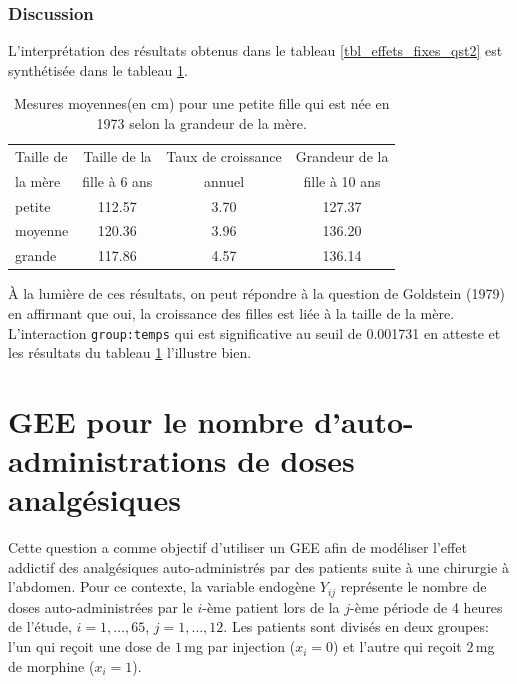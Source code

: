 \documentclass{article}
\begin{document}
	\subsubsection*{Discussion}
		L'interprétation des résultats obtenus dans le tableau \ref{tbl_effets_fixes_qst2} est synthétisée dans le tableau \ref{tbl_interpretation_qst2}.
		\begin{table}[H]
			\centering
			\begin{tabular}{lccc}
				\hline
				Taille de  & Taille de la  & Taux de croissance  &  Grandeur de la \\
				la mère & fille à 6 ans & annuel &  fille à 10 ans \\
				\hline
				petite & 112.57 & 3.70 & 127.37 \\
				moyenne & 120.36 & 3.96 & 136.20 \\
				grande & 117.86 & 4.57 & 136.14 \\
				\hline
			\end{tabular}
			\caption{Mesures moyennes(en cm) pour une petite fille qui est née en 1973 selon la grandeur de la mère.}
			\label{tbl_interpretation_qst2}
		\end{table}
				
		À la lumière de ces résultats, on peut répondre à la question de Goldstein (1979) en affirmant que oui, la croissance des filles est liée à la taille de la mère.
		L'interaction \texttt{group:temps} qui est significative au seuil de 0.001731 en atteste et les résultats du tableau \ref{tbl_interpretation_qst2} l'illustre bien.
		

\section{GEE pour le nombre d'auto-administrations de doses analgésiques}

	Cette question a comme objectif d'utiliser un GEE afin de modéliser l'effet addictif des analgésiques auto-administrés par des patients suite à une chirurgie à l'abdomen. 
	Pour ce contexte, la variable endogène $Y_{ij}$ représente le nombre de doses auto-administrées par le $i$-ème patient lors de la $j$-ème période de 4 heures de l'étude, $i = 1, \dots, 65$, $j=1,\dots,12$. Les patients sont divisés en deux groupes: l'un qui reçoit une dose de $1\,$mg par injection ($x_i =0$) et l'autre qui reçoit $2\,$mg de morphine ($x_i =1$). 
	
\end{document}
